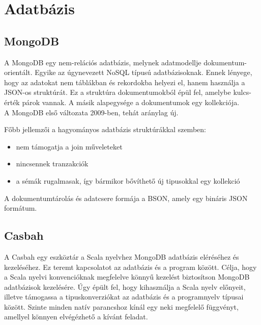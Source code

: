 \section{Adatbázis}
\subsection{MongoDB}
A MongoDB egy nem-relációs adatbázis, melynek adatmodellje dokumentum-orientált. Egyike az úgynevezett NoSQL típusú adatbázisoknak. Ennek lényege, hogy az adatokat nem táblákban és rekordokba helyezi el, hanem használja a JSON-os struktúrát. Ez a struktúra dokumentumokból épül fel, amelybe kulcs-érték párok vannak. A másik alapegysége a dokumentumok egy kollekciója.\\
A MongoDB első változata 2009-ben, tehát aránylag új.

Főbb jellemzői a hagyományos adatbázis struktúrákkal szemben:
\begin{itemize}
  \item nem támogatja a join műveleteket
  \item nincsennek tranzakciók
  \item a sémák rugalmasak, így bármikor bővíthető új tipusokkal egy kollekció
\end{itemize}

A dokumentumtárolás és adatcsere formája a BSON, amely egy bináris JSON formátum.

\subsection{Casbah}
A Casbah egy eszköztár a Scala nyelvhez MongoDB adatbázis eléréséhez és kezeléséhez. Ez teremt kapcsolatot az adatbázis és a program között. Célja, hogy a  Scala nyelvi konvencióknak megfelelve könnyű kezelést biztosítson MongoDB adatbázisok kezelésére. Úgy épült fel, hogy kihasználja a Scala nyelv előnyeit, illetve támogassa a tipuskonverziókat az adatbázis és a programnyelv típusai között. Szinte minden natív parancshoz kínál egy neki megfelelő függvényt, amellyel könnyen elvégézhető a kívánt feladat.